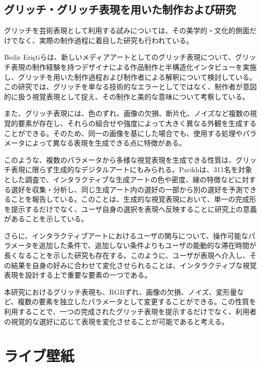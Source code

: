 \subsection{グリッチ・グリッチ表現を用いた制作および研究}

グリッチを芸術表現として利用する試みについては、その美学的・文化的側面だけでなく、実際の制作過程に着目した研究も行われている。

Bedir Eriştiらは、新しいメディアアートとしてのグリッチ表現について、グリッチ表現の制作経験を持つデザイナによる作品制作と半構造化インタビューを実施し、グリッチを用いた制作過程および制作者による解釈について検討している\cite{bedireristi2019glitch}。この研究では、グリッチを単なる技術的なエラーとしてではなく、制作者が意図的に扱う視覚表現として捉え、その制作と美的な意味について考察している。

また、グリッチ表現には、色のずれ、画像の欠損、断片化、ノイズなど複数の視覚的要素が存在し、それらの組合せや強度によって大きく異なる外観を生成することができる。そのため、同一の画像を基にした場合でも、使用する処理やパラメータによって異なる表現を生成できる点に特徴がある。

このような、複数のパラメータから多様な視覚表現を生成できる性質は、グリッチ表現に限らず生成的なデジタルアートにもみられる。Parikhは、311名を対象とした調査で、インタラクティブな生成アートの色や密度、線の特徴などに対する選好を収集・分析し、同じ生成アート内の選好の一部から別の選好を予測できることを報告している\cite{parikh2020generative}。このことは、生成的な視覚表現において、単一の完成形を提示するだけでなく、ユーザ自身の選択を表現へ反映することに研究上の意義があることを示している。

さらに、インタラクティブアートにおけるユーザの関与について、操作可能なパラメータを追加した条件で、追加しない条件よりもユーザの能動的な滞在時間が長くなることを示した研究も存在する\cite{krzyzaniak2022engaging}。このように、ユーザが表現へ介入し、その結果を自身の好みに合わせて変化させられることは、インタラクティブな視覚表現を設計する上で重要な要素の一つである。

本研究におけるグリッチ表現も、RGBずれ、画像の欠損、ノイズ、変形量など、複数の要素を独立したパラメータとして変更することができる。この性質を利用することで、一つの完成されたグリッチ表現を提示するだけでなく、利用者の視覚的な選好に応じて表現を変化させることが可能であると考える。



\section{ライブ壁紙}
